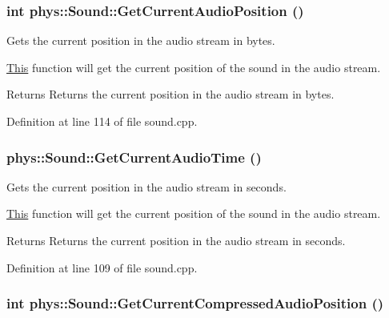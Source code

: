 \hypertarget{classphys_1_1Sound_a0ef4ddd4096758f9c883fe93194b9b3b}{
\subsubsection[{GetCurrentAudioPosition}]{\setlength{\rightskip}{0pt plus 5cm}int phys::Sound::GetCurrentAudioPosition ()}}
\label{dc/d2f/classphys_1_1Sound_a0ef4ddd4096758f9c883fe93194b9b3b}


Gets the current position in the audio stream in bytes. 

\hyperlink{structThis}{This} function will get the current position of the sound in the audio stream. \begin{DoxyReturn}{Returns}
Returns the current position in the audio stream in bytes. 
\end{DoxyReturn}


Definition at line 114 of file sound.cpp.

\hypertarget{classphys_1_1Sound_ace3c118ee42540be51dcf64940d4f1e0}{
\subsubsection[{GetCurrentAudioTime}]{ phys::Sound::GetCurrentAudioTime ()}}
\label{dc/d2f/classphys_1_1Sound_ace3c118ee42540be51dcf64940d4f1e0}


Gets the current position in the audio stream in seconds. 

\hyperlink{structThis}{This} function will get the current position of the sound in the audio stream. \begin{DoxyReturn}{Returns}
Returns the current position in the audio stream in seconds. 
\end{DoxyReturn}


Definition at line 109 of file sound.cpp.

\hypertarget{classphys_1_1Sound_adbcd16d55670bc6d97a1ce9b3d22d90c}{
\subsubsection[{GetCurrentCompressedAudioPosition}]{\setlength{\rightskip}{0pt plus 5cm}int phys::Sound::GetCurrentCompressedAudioPosition ()}}
\label{dc/d2f/classphys_1_1Sound_adbcd16d55670bc6d97a1ce9b3d22d90c}


